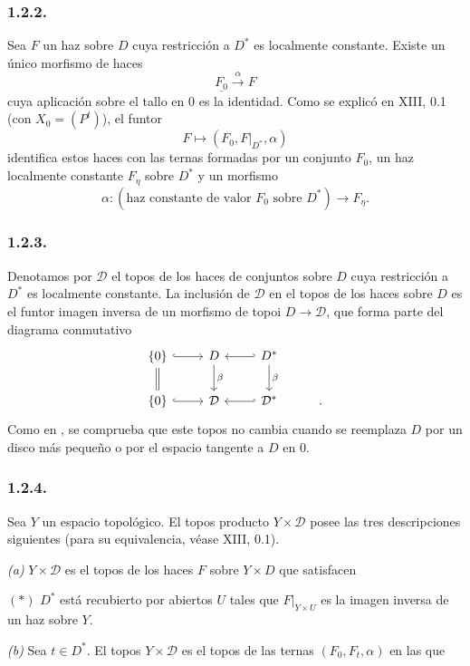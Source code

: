 \subsubsection*{1.2.2.}
Sea $F$ un haz sobre $D$ cuya restricción a $D^*$ es localmente constante.
Existe un único morfismo de haces
\[
\underline{F_0}\xrightarrow{\ \alpha\ }F
\]
cuya aplicación sobre el tallo en $0$ es la identidad. Como se explicó en
XIII, 0.1 (con $X_0=(P^t)$), el funtor
\[
F\longmapsto(F_0,F|_{D^*},\alpha)
\]
identifica estos haces con las ternas formadas por un conjunto $F_0$, un haz
localmente constante $F_\eta$ sobre $D^*$ y un morfismo
\[
\alpha:
(\text{haz constante de valor }F_0\text{ sobre }D^*)
\longrightarrow F_\eta.
\]

\subsubsection*{1.2.3.}
Denotamos por $\mathcal D$ el topos de los haces de conjuntos sobre $D$ cuya
restricción a $D^*$ es localmente constante. La inclusión de $\mathcal D$ en
el topos de los haces sobre $D$ es el funtor imagen inversa de un morfismo de
topoi $D\longrightarrow\mathcal D$, que forma parte del diagrama conmutativo
\[
\begin{tikzcd}
\{0\} \arrow[r, hook] \arrow[d, equal]
  & D \arrow[d, "\beta"]
  & D^* \arrow[l, hook'] \arrow[d, "\beta"] & {} \\
\{0\} \arrow[r, hook]
  & \mathcal D
  & \mathcal D^* \arrow[l, hook'] & {}.
\end{tikzcd}
\]
Como en , se comprueba que este topos no cambia cuando se reemplaza $D$
por un disco más pequeño o por el espacio tangente a $D$ en $0$.

\pageoriginale

\subsubsection*{1.2.4.}
Sea $Y$ un espacio topológico. El topos producto $Y\times\mathcal D$ posee las
tres descripciones siguientes (para su equivalencia, véase XIII, 0.1).

\medskip
\noindent\textit{(a)} $Y\times\mathcal D$ es el topos de los haces $F$ sobre
$Y\times D$ que satisfacen

\smallskip
\noindent $(*)$ $D^*$ está recubierto por abiertos $U$ tales que
$F|_{Y\times U}$ es la imagen inversa de un haz sobre $Y$.

\medskip
\noindent\textit{(b)} Sea $t\in D^*$. El topos $Y\times\mathcal D$ es el
topos de las ternas $(F_0,F_t,\alpha)$ en las que


